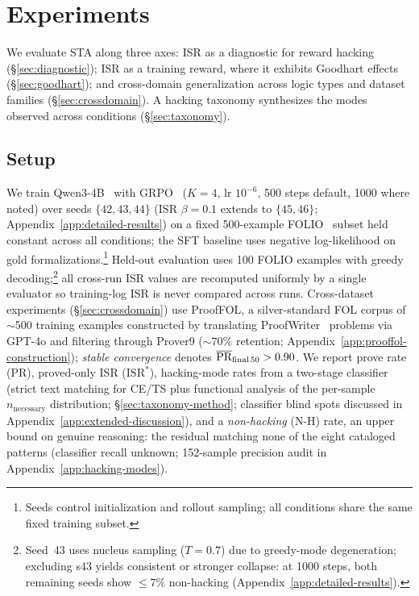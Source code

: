 \section{Experiments}
\label{sec:experiments}

We evaluate STA along three axes: ISR as a diagnostic for reward hacking (\S\ref{sec:diagnostic}); ISR as a training reward, where it exhibits Goodhart effects (\S\ref{sec:goodhart}); and cross-domain generalization across logic types and dataset families (\S\ref{sec:crossdomain}).
A hacking taxonomy synthesizes the modes observed across conditions (\S\ref{sec:taxonomy}).

\subsection{Setup}\label{sec:setup}

We train Qwen3-4B~\citep{qwen3} with GRPO~\citep{deepseekmath} ($K{=}4$, lr $10^{-6}$, 500 steps default, 1000 where noted) over seeds $\{42,43,44\}$ (ISR $\beta{=}0.1$ extends to $\{45,46\}$; Appendix~\ref{app:detailed-results}) on a fixed 500-example FOLIO~\citep{folio} subset held constant across all conditions; the SFT baseline uses negative log-likelihood on gold formalizations.\footnote{Seeds control initialization and rollout sampling; all conditions share the same fixed training subset.}
Held-out evaluation uses 100 FOLIO examples with greedy decoding;\footnote{Seed~43 uses nucleus sampling ($T{=}0.7$) due to greedy-mode degeneration; excluding s43 yields consistent or stronger collapse: at 1000 steps, both remaining seeds show ${\leq}7\%$ non-hacking (Appendix~\ref{app:detailed-results}).} all cross-run ISR values are recomputed uniformly by a single evaluator so training-log ISR is never compared across runs.
Cross-dataset experiments (\S\ref{sec:crossdomain}) use ProofFOL, a silver-standard FOL corpus of ${\sim}$500 training examples constructed by translating ProofWriter~\citep{proofwriter} problems via GPT-4o and filtering through Prover9 (${\sim}70\%$ retention; Appendix~\ref{app:prooffol-construction}); \emph{stable convergence} denotes $\overline{\text{PR}}_{\text{final\,50}} > 0.90$.
We report prove rate (PR), proved-only ISR ($\text{ISR}^*$), hacking-mode rates from a two-stage classifier (strict text matching for CE/TS plus functional analysis of the per-sample $n_{\text{necessary}}$ distribution; \S\ref{sec:taxonomy-method}; classifier blind spots discussed in Appendix~\ref{app:extended-discussion}), and a \emph{non-hacking} (N-H) rate, an upper bound on genuine reasoning: the residual matching none of the eight cataloged patterns (classifier recall unknown; 152-sample precision audit in Appendix~\ref{app:hacking-modes}).

